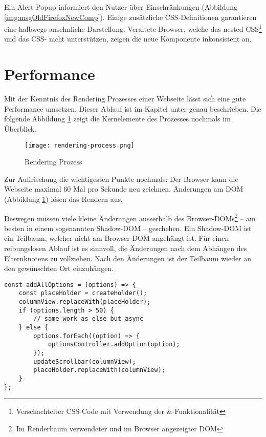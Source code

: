 Ein Alert-Popup informiert den Nutzer über Einschränkungen (Abbildung \ref{img:msgOldFirefoxNewComp}). 
Einige zusätzliche CSS-Definitionen garantieren eine halbwegs ansehnliche Darstellung. 
Veraltete Browser, welche das nested CSS\footnote{
    Verschachtelter CSS-Code mit Verwendung der \&-Funktionalität
} und das CSS- nicht unterstützen, zeigen die neue Komponente inkonsistent an. 


\section{Performance}
\label{sec:performance}

Mit der Kenntnis des Rendering Prozesses einer Webseite lässt sich eine gute Performance umsetzen. 
Dieser Ablauf ist im Kapitel \textbf{} unter \textbf{} genau beschrieben. 
Die folgende Abbildung \ref{img:renderingProcessRecap} zeigt die Kernelemente des Prozesses nochmals im Überblick. 

\begin{figure}[!htb]
    \centering
    \texttt{[image: rendering-process.png]}
    \caption{\centering Rendering Prozess}
    \label{img:renderingProcessRecap}
\end{figure}

Zur Auffrischung die wichtigesten Punkte nochmals: 
Der Browser kann die Webseite maximal 60 Mal pro Sekunde neu zeichnen. 
Änderungen am DOM (Abbildung \ref{img:renderingProcessRecap}) lösen das Rendern aus. 

Deswegen müssen viele kleine Änderungen ausserhalb des Browser-DOMs\footnote{
    Im Renderbaum verwendeter und im Browser angezeigter DOM
} – am besten in einem sogenannten Shadow-DOM – geschehen. 
Ein Shadow-DOM ist ein Teilbaum, welcher nicht am Browser-DOM angehängt ist. 
Für einen reibungslosen Ablauf ist es sinnvoll, die Änderungen nach dem Abhängen des Elternknotens zu vollziehen. 
Nach den Änderungen ist der Teilbaum wieder an den gewünschten Ort einzuhängen. 

\begin{lstlisting}[style = htmlcssjs, caption = Performance Optimierung (aus \codestyle{columnOptionsComponent.js}), label = code:performanceOptimization]
const addAllOptions = (options) => {
    const placeHolder = createHolder();
    columnView.replaceWith(placeHolder);
    if (options.length > 50) {
        // same work as else but async
    } else {
        options.forEach((option) => {
            optionsController.addOption(option);
        });
        updateScrollbar(columnView);
        placeHolder.replaceWith(columnView);
    }
};
\end{lstlisting}

